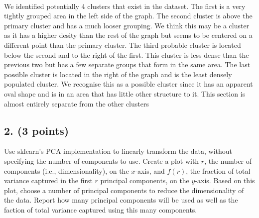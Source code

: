 \documentclass[11pt]{article}
\begin{document}
    \begin{center}
    \end{center}
    { \hspace*{\fill} \\}

    We identified potentially 4 clusters that exist in the dataset. The
first is a very tightly grouped area in the left side of the graph. The
second cluster is above the primary cluster and has a much looser
grouping. We think this may be a cluster as it has a higher desity than
the rest of the graph but seems to be centered on a different point than
the primary cluster. The third probable cluster is located below the
second and to the right of the first. This cluster is less dense than
the previous two but has a few separate groups that form in the same
area. The last possible cluster is located in the right of the graph and
is the least densely populated cluster. We recognise this as a possible
cluster since it has an apparent oval shape and is in an area that has
little other structure to it. This section is almost entirely separate
from the other clusters

    \hypertarget{points}{%
\subsection*{2. (3 points)}\label{points}}

    Use sklearn's PCA implementation to linearly transform the data, without
specifying the number of components to use. Create a plot with \(r\),
the number of components (i.e., dimensionality), on the \(x\)-axis, and
\(f(r)\), the fraction of total variance captured in the first \(r\)
principal components, on the \(y\)-axis. Based on this plot, choose a
number of principal components to reduce the dimensionality of the data.
Report how many principal components will be used as well as the faction
of total variance captured using this many components.
\end{document}

